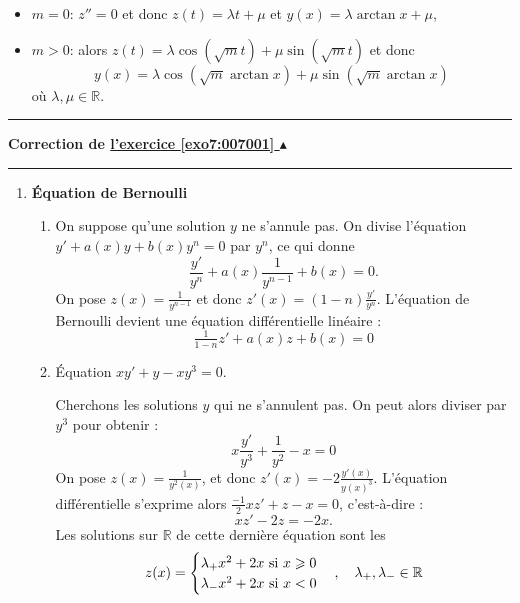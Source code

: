 \documentclass[11pt,a4paper]{article}
\newcommand{\Rr}{\mathbb{R}} \newcommand{\R}{\mathbb{R}}
\renewcommand{\ge}{\geqslant} \renewcommand{\geq}{\geqslant}
\newcounter{exo}
\newcommand{\correction}[1]{\hypertarget{cor7:#1}{}\label{cor7:#1}{\bf Correction de \hyperlink{exo7:#1}{l'exercice \ref{exo7:#1} $\blacktriangle$}}\vspace{1mm}\hrule\vspace{1mm}}
\newcommand{\fincorrection}{\vspace{1mm}\hrule\vspace*{7mm}}
\begin{document}
\begin{enumerate}
\begin{itemize}
  \item $m=0$: $z''=0$ et donc $z(t)=\lambda t+\mu$ et $y(x)=\lambda\arctan x+\mu$,
  
  \item $m>0$: alors $z(t)=\lambda\cos(\sqrt{m}t)+\mu\sin(\sqrt{m}t)$ et donc 
$$y(x)=\lambda\cos(\sqrt{m}\arctan x)+\mu\sin(\sqrt{m}\arctan x)$$
où $\lambda,\mu\in\R$.
\end{itemize}

\end{enumerate}
\fincorrection
\correction{007001}
\begin{enumerate}
  \item \textbf{\'Equation de Bernoulli}
  \begin{enumerate}
    \item On suppose qu'une solution $y$ ne s'annule pas.
    On divise l'équation $y'+a(x)y+b(x)y^n = 0$ par $y^n$, ce qui donne
    $$\frac{y'}{y^n} +a(x) \frac{1}{y^{n-1}} + b(x) = 0.$$
    On pose $z(x) = \frac{1}{y^{n-1}}$ et donc $z'(x) = (1-n)\frac{y'}{y^{n}}$.
    L'équation de Bernoulli devient une équation différentielle linéaire :
    $$\tfrac{1}{1-n} z' + a(x) z +b(x) = 0$$
    
    
    \item \'Equation $xy'+y-xy^3 = 0$.
    
    Cherchons les solutions $y$ qui ne s'annulent pas. On peut alors diviser par $y^3$ pour obtenir :
    $$x \frac{y'}{y^3} + \frac{1}{y^2} - x=0$$
    On pose $z(x) = \frac{1}{y^2(x)}$, et donc $z'(x) = -2\frac{y'(x)}{y(x)^3}$.
    L'équation différentielle s'exprime alors $\frac{-1}{2} xz'+z -x = 0$, c'est-à-dire :
    $$xz'-2z = -2x.$$
    Les solutions  sur $\Rr$ de cette dernière équation sont les 
    $$z(x) =\begin{cases} \lambda_+ x^2+2x\ \text{si}\ x\ge 0 \cr\lambda_- x^2+2x\ 
    \text{si}\ x< 0 \end{cases} ,\quad\lambda_+,\lambda_- \in \Rr$$
    

\end{enumerate}
\end{enumerate}
\end{document}
